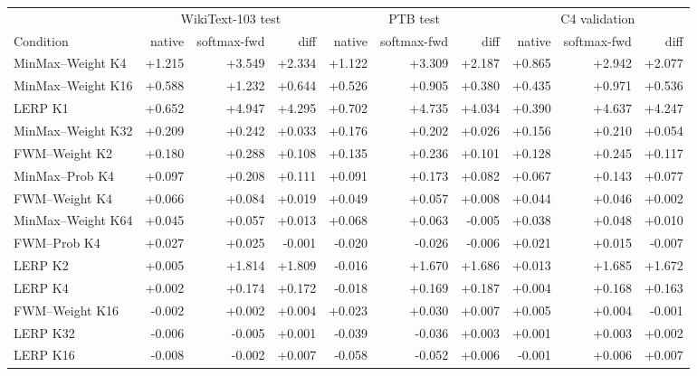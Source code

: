 \begin{tabular}{lrrrrrrrrr}
\toprule
& \multicolumn{3}{c}{WikiText-103 test} & \multicolumn{3}{c}{PTB test} & \multicolumn{3}{c}{C4 validation} \\
\cmidrule(lr){2-4}\cmidrule(lr){5-7}\cmidrule(lr){8-10}
Condition & native & softmax-fwd & diff & native & softmax-fwd & diff & native & softmax-fwd & diff \\
\midrule
MinMax--Weight K4 & +1.215 & +3.549 & +2.334 & +1.122 & +3.309 & +2.187 & +0.865 & +2.942 & +2.077 \\
MinMax--Weight K16 & +0.588 & +1.232 & +0.644 & +0.526 & +0.905 & +0.380 & +0.435 & +0.971 & +0.536 \\
LERP K1 & +0.652 & +4.947 & +4.295 & +0.702 & +4.735 & +4.034 & +0.390 & +4.637 & +4.247 \\
MinMax--Weight K32 & +0.209 & +0.242 & +0.033 & +0.176 & +0.202 & +0.026 & +0.156 & +0.210 & +0.054 \\
FWM--Weight K2 & +0.180 & +0.288 & +0.108 & +0.135 & +0.236 & +0.101 & +0.128 & +0.245 & +0.117 \\
MinMax--Prob K4 & +0.097 & +0.208 & +0.111 & +0.091 & +0.173 & +0.082 & +0.067 & +0.143 & +0.077 \\
FWM--Weight K4 & +0.066 & +0.084 & +0.019 & +0.049 & +0.057 & +0.008 & +0.044 & +0.046 & +0.002 \\
MinMax--Weight K64 & +0.045 & +0.057 & +0.013 & +0.068 & +0.063 & -0.005 & +0.038 & +0.048 & +0.010 \\
FWM--Prob K4 & +0.027 & +0.025 & -0.001 & -0.020 & -0.026 & -0.006 & +0.021 & +0.015 & -0.007 \\
LERP K2 & +0.005 & +1.814 & +1.809 & -0.016 & +1.670 & +1.686 & +0.013 & +1.685 & +1.672 \\
LERP K4 & +0.002 & +0.174 & +0.172 & -0.018 & +0.169 & +0.187 & +0.004 & +0.168 & +0.163 \\
FWM--Weight K16 & -0.002 & +0.002 & +0.004 & +0.023 & +0.030 & +0.007 & +0.005 & +0.004 & -0.001 \\
LERP K32 & -0.006 & -0.005 & +0.001 & -0.039 & -0.036 & +0.003 & +0.001 & +0.003 & +0.002 \\
LERP K16 & -0.008 & -0.002 & +0.007 & -0.058 & -0.052 & +0.006 & -0.001 & +0.006 & +0.007 \\
\bottomrule
\end{tabular}
